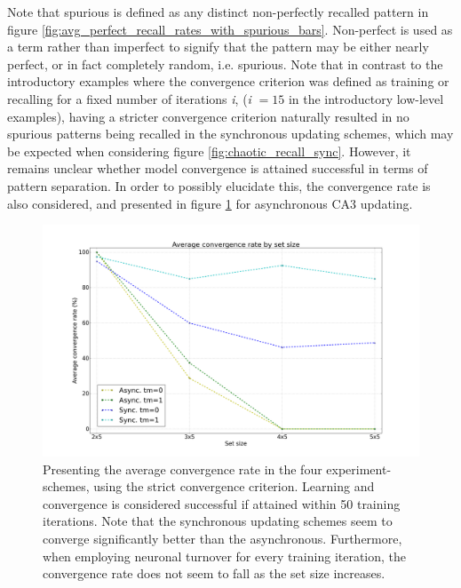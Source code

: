 Note that spurious is defined as any distinct non-perfectly recalled pattern in figure \ref{fig:avg_perfect_recall_rates_with_spurious_bars}. Non-perfect is used as a term rather than imperfect to signify that the pattern may be either nearly perfect, or in fact completely random, i.e. spurious. Note that in contrast to the introductory examples where the convergence criterion was defined as training or recalling for a fixed number of iterations \textit{i}, (\textit{i} $=15$ in the introductory low-level examples), having a stricter convergence criterion naturally resulted in no spurious patterns being recalled in the synchronous updating schemes, which may be expected when considering figure \ref{fig:chaotic_recall_sync}. However, it remains unclear whether model convergence is attained successful in terms of pattern separation. In order to possibly elucidate this, the convergence rate is also considered, and presented in figure \ref{fig:convergence_rates_async_sync} for asynchronous CA3 updating.

\begin{figure}
    \centering
    \includegraphics[width=14cm]{fig/avg_convergence_rate}
    \caption{Presenting the average convergence rate in the four experiment-schemes, using the strict convergence criterion. Learning and convergence is considered successful if attained within 50 training iterations. Note that the synchronous updating schemes seem to converge significantly better than the asynchronous. Furthermore, when employing neuronal turnover for every training iteration, the convergence rate does not seem to fall as the set size increases.}
    \label{fig:convergence_rates_async_sync}
\end{figure}

